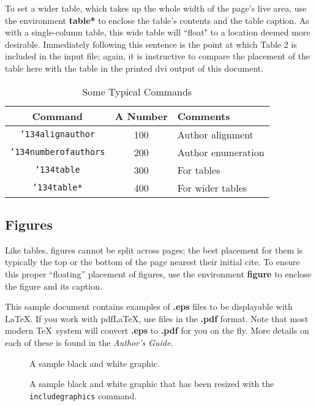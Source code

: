 \documentclass{sig-alternate-05-2015}
\begin{document}
	To set a wider table, which takes up the whole width of
	the page's live area, use the environment
	\textbf{table*} to enclose the table's contents and
	the table caption.  As with a single-column table, this wide
	table will ``float" to a location deemed more desirable.
	Immediately following this sentence is the point at which
	Table 2 is included in the input file; again, it is
	instructive to compare the placement of the
	table here with the table in the printed dvi
	output of this document.
	
	
	\begin{table*}
		\centering
		\caption{Some Typical Commands}
		\begin{tabular}{|c|c|l|} \hline
			Command&A Number&Comments\\ \hline
			\texttt{{\char'134}alignauthor} & 100& Author alignment\\ \hline
			\texttt{{\char'134}numberofauthors}& 200& Author enumeration\\ \hline
			\texttt{{\char'134}table}& 300 & For tables\\ \hline
			\texttt{{\char'134}table*}& 400& For wider tables\\ \hline\end{tabular}
	\end{table*}
	
	\subsection{Figures}
	Like tables, figures cannot be split across pages; the
	best placement for them
	is typically the top or the bottom of the page nearest
	their initial cite.  To ensure this proper ``floating'' placement
	of figures, use the environment
	\textbf{figure} to enclose the figure and its caption.
	
	This sample document contains examples of \textbf{.eps} files to be
	displayable with \LaTeX.  If you work with pdf\LaTeX, use files in the
	\textbf{.pdf} format.  Note that most modern \TeX\ system will convert
	\textbf{.eps} to \textbf{.pdf} for you on the fly.  More details on
	each of these is found in the \textit{Author's Guide}.
	
	\begin{figure}
		\centering
		\caption{A sample black and white graphic.}
	\end{figure}
	
	\begin{figure}
		\centering
		\caption{A sample black and white graphic
			that has been resized with the \texttt{includegraphics} command.}
	\end{figure}
	
\end{document}
